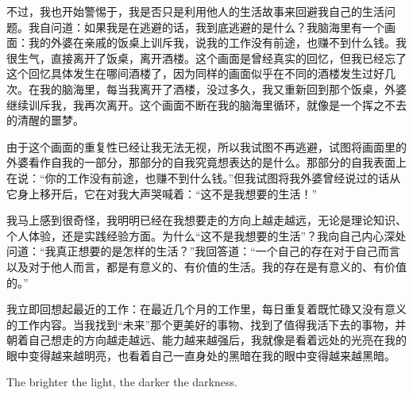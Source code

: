不过，我也开始警惕于，我是否只是利用他人的生活故事来回避我自己的生活问题。我自问道：如果我是在逃避的话，我到底逃避的是什么？我脑海里有一个画面：我的外婆在亲戚的饭桌上训斥我，说我的工作没有前途，也赚不到什么钱。我很生气，直接离开了饭桌，离开酒楼。这个画面是曾经真实的回忆，但我已经忘了这个回忆具体发生在哪间酒楼了，因为同样的画面似乎在不同的酒楼发生过好几次。在我的脑海里，每当我离开了酒楼，没过多久，我又重新回到那个饭桌，外婆继续训斥我，我再次离开。这个画面不断在我的脑海里循环，就像是一个挥之不去的清醒的噩梦。

由于这个画面的重复性已经让我无法无视，所以我试图不再逃避，试图将画面里的外婆看作自我的一部分，那部分的自我究竟想表达的是什么。那部分的自我表面上在说：“你的工作没有前途，也赚不到什么钱。”但我试图将我外婆曾经说过的话从它身上移开后，它在对我大声哭喊着：“这不是我想要的生活！”

我马上感到很奇怪，我明明已经在我想要走的方向上越走越远，无论是理论知识、个人体验，还是实践经验方面。为什么“这不是我想要的生活”？我向自己内心深处问道：“我真正想要的是怎样的生活？”我回答道：“一个自己的存在对于自己而言以及对于他人而言，都是有意义的、有价值的生活。我的存在是有意义的、有价值的。”

我立即回想起最近的工作：在最近几个月的工作里，每日重复着既忙碌又没有意义的工作内容。当我找到“未来”那个更美好的事物、找到了值得我活下去的事物，并朝着自己想走的方向越走越远、能力越来越强后，我就像是看着远处的光亮在我的眼中变得越来越明亮，也看着自己一直身处的黑暗在我的眼中变得越来越黑暗。

The brighter the light, the darker the darkness.
